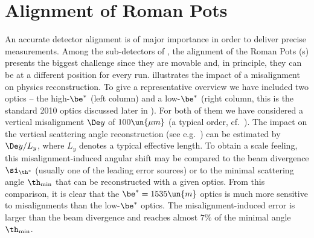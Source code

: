 \chapter[al]{Alignment of Roman Pots}


An accurate detector alignment is of major importance in order to deliver precise measurements. Among the sub-detectors of , the alignment of the Roman Pots (s) presents the biggest challenge since they are movable and, in principle, they can be at a different position for every run.  illustrates the impact of a misalignment on physics reconstruction. To give a representative overview we have included two optics -- the high-$\be^*$ (left column) and a low-$\be^*$ (right column, this is the standard 2010  optics discussed later in ). For both of them we have considered a vertical misalignment $\De y$ of $100\un{\mu m}$ (a typical order, cf.~). The impact on the vertical scattering angle reconstruction (see e.g.~) can be estimated by $\De y/L_y$, where $L_y$ denotes a typical effective length. To obtain a scale feeling, this misalignment-induced angular shift may be compared to the beam divergence $\si_{\th^*}$ (usually one of the leading error sources) or to the minimal scattering angle $\th_{\rm min}$ that can be reconstructed with a given optics. From this comparison, it is clear that the $\be^* = 1535\un{m}$ optics is much more sensitive to misalignments than the low-$\be^*$ optics. The misalignment-induced error is larger than the beam divergence and reaches almost $7\percent$ of the minimal angle $\th_{\rm min}$.



